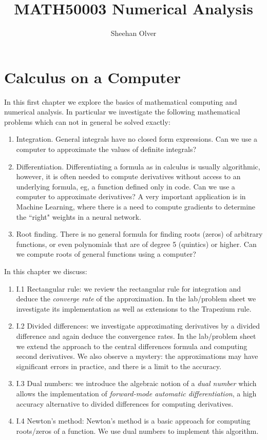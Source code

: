\documentclass[12pt,a4paper]{book}
\title{ MATH50003 Numerical Analysis }
\author{ Sheehan Olver }
\theoremstyle{definition}
\begin{document}
\maketitle

\tableofcontents

\chapter{Calculus on a Computer}

In this first chapter we explore the basics of mathematical computing and numerical analysis.
In particular we investigate the following mathematical problems which can not in general be solved exactly:

\begin{enumerate}
\item Integration. General integrals have no closed form expressions. Can we use a computer to approximate the values of definite integrals?
\item Differentiation. Differentiating a formula as in calculus is usually algorithmic, however, it is often needed to compute derivatives without access to an underlying formula, eg,  a function defined only in code. Can we use a computer to approximate derivatives?  A very important application is in Machine Learning, where there is a need to compute gradients to determine the ``right" weights in a neural network.
\item Root finding. There is no general formula for finding roots (zeros) of arbitrary functions, or even polynomials that are of degree 5 (quintics) or higher. Can we compute roots of general functions using a computer?
\end{enumerate}

In this chapter we discuss:

\begin{enumerate}
\item I.1 Rectangular rule: we review the rectangular rule for integration and deduce the {\it converge rate} of the approximation. In the lab/problem sheet  we investigate its implementation as well as extensions to the Trapezium rule.
\item I.2 Divided differences: we investigate approximating derivatives by a divided difference and again deduce the convergence rates. In the lab/problem sheet we extend the approach to the central differences formula and computing second derivatives. We also observe a mystery: the approximations may have significant errors in practice, and there is a limit to the accuracy.
\item I.3 Dual numbers: we introduce the algebraic notion of a {\it dual number} which allows the implementation of {\it forward-mode automatic differentiation}, a high accuracy alternative to divided differences for computing derivatives.
\item I.4 Newton's method: Newton's method is a basic approach for computing roots/zeros of a function. We use dual numbers to implement this algorithm.
\end{enumerate}
\end{document}
